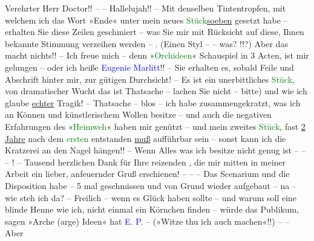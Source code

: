 \pstart{}Verehrter Herr Doctor!! – –\pend\vspace{0.5em}
\pstart
           Hallelujah!! – Mit denselben Tintentropfen, mit welchem ich das Wort »Ende« unter
               mein neues \textcolor{green}{Stück}{}\ledrightnote{{$\rightarrow$}\textcolor{green}{Orchideen [Schauspiel in drei Akten]}}{ }\uline{soeben} gesetzt habe – erhalten Sie diese Zeilen
               geschmiert – was Sie mir mit Rücksicht auf diese, Ihnen bekannte Stimmung verzeihen
               werden – . (Einen Styl – – \introOben{}was?\introOben{} !!?) Aber das macht nichts!!
               – Ich freue mich – denn »\textcolor{green}{Orchideen}{}\ledrightnote{\textcolor{green}{Orchideen [Schauspiel in drei Akten]}}« Schauspiel
               in 3 Acten, ist mir gelungen – oder ich heiße \textcolor{blue}{Eugenie Marlitt}{}\ledrightnote{\textcolor{blue}{E. Marlitt}}!! – Sie erhalten es, sobald Feile und Abschrift {\pb}hinter mir, zur gütigen Durchsicht! – Es ist ein unerbittliches \textcolor{green}{Stück}{}\ledrightnote{{$\rightarrow$}\textcolor{green}{Orchideen [Schauspiel in drei Akten]}}, von dramatischer Wucht das ist
               Thatsache – lachen Sie nicht – bitte) und wie ich glaube \uline{echter} Tragik! – Thatsache – blos – ich habe  zusammengekratzt, was ich an Können und künstlerischem Wollen besitze
               – und auch die negativen Erfahrungen des »\textcolor{green}{Heimweh}{}\ledrightnote{\textcolor{green}{Heimweh [dreiaktige Tragikomödie]}}« haben mir genützt – und mein zweites \textcolor{green}{Stück}{}\ledrightnote{{$\rightarrow$}\textcolor{green}{Orchideen [Schauspiel in drei Akten]}}, fast \uline{2
                  Jahre} nach dem \textcolor{green}{ersten}{}\ledrightnote{{$\rightarrow$}\textcolor{green}{Heimweh [dreiaktige Tragikomödie]}}
               entstanden \uline{muß} aufführbar sein – sonst kann ich die
               Kratzerei an den Nagel hängen!! – Wenn Alles was ich besitze nicht genug ist – – – !
               – Tausend herzlichen Dank für Ihre reizenden \label{K_L03709-1v}\label{}, die mir mitten in meiner Arbeit ein lieber, anfeuernder Gruß
                  {\pb}erschienen! – – – Das Scenarium und die Disposition habe – 5 mal
               geschmissen und von Grund wieder aufgebaut – na – wie steh ich da? – Freilich – wenn
               es Glück haben sollte – und warum soll eine blinde Henne wie ich, nicht einmal ein
               Körnchen finden – würde das Publikum, sagen »Arche (arge) Ideen« hat \textcolor{blue}{E. P.}{}\ledrightnote{\textcolor{blue}{Elsa Plessner}} – (»Witze thu ich auch machen«!!) – – Aber

